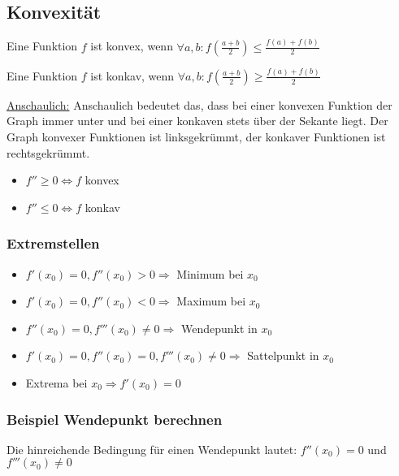 \subsection{Konvexität}
\begin{definition}[konvex]
Eine Funktion $f$ ist konvex, wenn $\forall a,b: f(\frac{a + b}{2}) \leq \frac{f(a) + f(b)}{2}$
\end{definition}

\begin{definition}[konkav]
Eine Funktion $f$ ist konkav, wenn $\forall a,b: f(\frac{a + b}{2}) \geq \frac{f(a) + f(b)}{2}$
\end{definition}

\underline{Anschaulich:} Anschaulich bedeutet das, dass bei einer konvexen Funktion
der Graph immer unter und bei einer konkaven stets über der Sekante liegt. Der Graph
konvexer Funktionen ist linksgekrümmt, der konkaver Funktionen ist rechtsgekrümmt.

\begin{itemize}
	\item $f'' \geq 0 \Leftrightarrow f$ konvex
	\item $f'' \leq 0 \Leftrightarrow f$ konkav
\end{itemize}

\subsubsection{Extremstellen}
\begin{itemize}
	\item $f'(x_0) = 0, f''(x_0) > 0 \Rightarrow$ Minimum bei $x_0$
	\item $f'(x_0) = 0, f''(x_0) < 0 \Rightarrow$ Maximum bei $x_0$
	\item $f''(x_0) = 0, f'''(x_0) \neq 0 \Rightarrow$ Wendepunkt in $x_0$
	\item $f'(x_0) = 0, f''(x_0) = 0, f'''(x_0) \neq 0 \Rightarrow$ Sattelpunkt in
  	$x_0$
	\item Extrema bei $x_0 \Rightarrow f'(x_0) = 0$
\end{itemize}

\subsubsection{Beispiel Wendepunkt berechnen}
Die hinreichende Bedingung für einen Wendepunkt lautet: $f''(x_0) = 0$ und $f'''(x_0) \not= 0$\\
 
